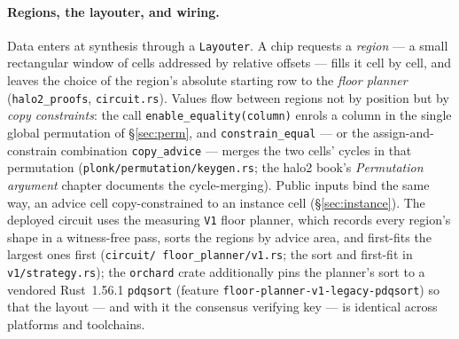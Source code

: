 \documentclass[11pt,a4paper]{article}
\theoremstyle{definition}
\begin{document}
\paragraph{Regions, the layouter, and wiring.}
Data enters at synthesis through a \texttt{Layouter}. A chip requests a
\emph{region} --- a small rectangular window of cells addressed by relative
offsets --- fills it cell by cell, and leaves the choice of the region's
absolute starting row to the \emph{floor planner}
(\texttt{halo2\_proofs}, \texttt{circuit.rs}). Values flow between regions
not by position but by \emph{copy constraints}: the call
\texttt{enable\_equality(column)} enrols a column in the single global
permutation of \S\ref{sec:perm}, and \texttt{constrain\_equal} --- or the
assign-and-constrain combination \texttt{copy\_advice} --- merges the two
cells' cycles in that permutation
(\texttt{plonk/\allowbreak permutation/\allowbreak keygen.rs}; the halo2 book's
\emph{Permutation argument} chapter documents the cycle-merging). Public
inputs bind the same way, an advice cell copy-constrained to an instance
cell (\S\ref{sec:instance}). The deployed circuit uses the measuring
\texttt{V1} floor planner, which records every region's shape in a
witness-free pass, sorts the regions by advice area, and first-fits the
largest ones first (\texttt{circuit/\allowbreak
floor\_planner/\allowbreak v1.rs}; the sort and first-fit in
\texttt{v1/\allowbreak strategy.rs}); the
\texttt{orchard} crate additionally pins the planner's sort to a vendored
Rust~1.56.1 \texttt{pdqsort} (feature
\texttt{floor-planner-v1-legacy-pdqsort}) so that the layout --- and with it
the consensus verifying key --- is identical across platforms and
toolchains.
\end{document}
